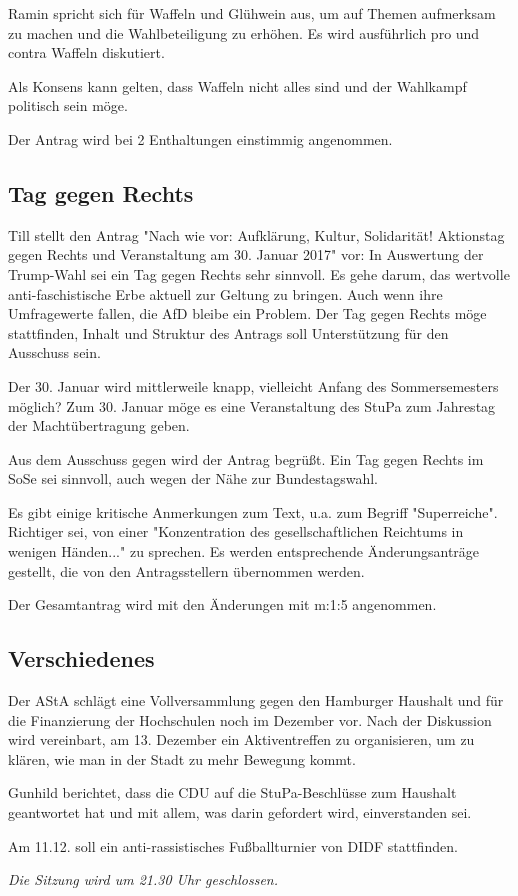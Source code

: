 \documentclass[ngerman,headheight=70pt]{scrartcl}
\begin{document}
    Ramin spricht sich für Waffeln und Glühwein aus, um auf Themen aufmerksam zu
    machen und die  Wahlbeteiligung zu erhöhen. Es wird ausführlich pro und
    contra Waffeln diskutiert.

    Als Konsens kann gelten, dass Waffeln nicht alles sind und der Wahlkampf
    politisch sein möge.

    Der Antrag wird bei 2 Enthaltungen einstimmig angenommen.

    \subsection{Tag gegen Rechts}

    Till stellt den Antrag "Nach wie vor: Aufklärung, Kultur, Solidarität!
    Aktionstag gegen Rechts und Veranstaltung am 30. Januar 2017" vor: In
    Auswertung der Trump-Wahl sei ein Tag gegen Rechts sehr sinnvoll. Es gehe
    darum, das wertvolle anti-faschistische Erbe aktuell zur Geltung zu bringen.
    Auch wenn ihre Umfragewerte fallen, die AfD bleibe ein Problem. Der Tag gegen
    Rechts möge stattfinden, Inhalt und Struktur des Antrags soll Unterstützung
    für den Ausschuss sein.

    Der 30. Januar wird mittlerweile knapp, vielleicht Anfang des Sommersemesters
    möglich? Zum 30. Januar möge es eine Veranstaltung des StuPa zum Jahrestag
    der Machtübertragung geben.

    Aus dem Ausschuss gegen wird der Antrag begrüßt. Ein Tag gegen Rechts im SoSe
    sei sinnvoll, auch  wegen der Nähe zur Bundestagswahl.

    Es gibt einige kritische Anmerkungen zum Text, u.a. zum Begriff
    "Superreiche". Richtiger sei, von einer "Konzentration des gesellschaftlichen
    Reichtums in wenigen Händen..." zu sprechen. Es werden entsprechende
    Änderungsanträge gestellt, die von den Antragsstellern übernommen werden.

    Der Gesamtantrag wird mit den Änderungen mit m:1:5 angenommen.

    \subsection{Verschiedenes}

    Der AStA schlägt eine Vollversammlung gegen den Hamburger Haushalt und für
    die Finanzierung der Hochschulen noch im Dezember vor. Nach der Diskussion
    wird vereinbart, am 13. Dezember ein Aktiventreffen zu organisieren, um zu
    klären, wie man in der Stadt zu mehr Bewegung kommt.

    Gunhild berichtet, dass die CDU auf die StuPa-Beschlüsse zum Haushalt
    geantwortet hat und mit allem, was darin gefordert wird, einverstanden sei.

    Am 11.12. soll ein anti-rassistisches Fußballturnier von DIDF stattfinden.

    \textit{Die Sitzung wird um 21.30 Uhr geschlossen.}
\end{document}
